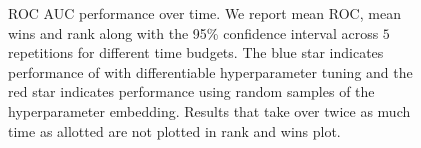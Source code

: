 \documentclass{article}
\begin{document}
%
\begin{figure}[t]
     \centering
     \begin{subfigure}[t]{0.32\textwidth}
         \centering
         
     \end{subfigure}
     \begin{subfigure}[t]{0.32\textwidth}
         \centering
         
     \end{subfigure}
     \begin{subfigure}[t]{0.32\textwidth}
         \centering
         
     \end{subfigure}
     \vspace{-.6cm}
     \begin{subfigure}[b]{1.0\textwidth}
         \centering
         
     \end{subfigure}
     \vspace{.3cm}
     \caption{ROC AUC performance over time. We report mean ROC, mean wins and rank along with the 95\% confidence interval across $5$ repetitions for different time budgets. The blue star indicates performance of \methodname{} with differentiable hyperparameter tuning and the red star indicates performance using random samples of the hyperparameter embedding. Results that take over twice as much time as allotted are not plotted in rank and wins plot.
     }
     \label{fig:perfovertime}
\end{figure}
\end{document}
